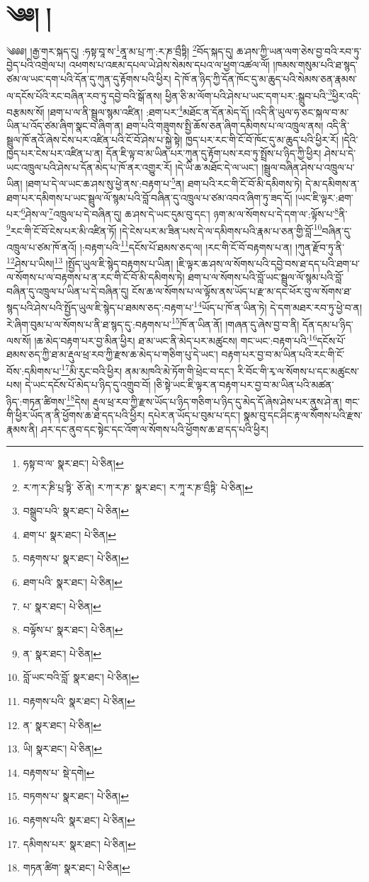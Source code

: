 \setcounter{footnote}{0} 
\chapter{༄༅། །}༄༅༅། །རྒྱ་གར་སྐད་དུ། :ཧསྟ་བཱ་ས་\footnote{ཧསྟ་བ་ལ་  སྣར་ཐང་།  པེ་ཅིན། }ནཱ་མ་པྲ་ཀ་:ར་ཎ་བྲྀཏྟི། \footnote{ར་ཀ་ར་ཎི་པྲ་ཏྟི་  ཅོ་ནེ། ར་ཀ་ར་ཎ་  སྣར་ཐང་། ར་ཀཱ་ར་ཎ་བྲྀཏྟི་  པེ་ཅིན། }བོད་སྐད་དུ། ཆ་ཤས་ཀྱི་ཡན་ལག་ཅེས་བྱ་བའི་རབ་ཏུ་བྱེད་པའི་འགྲེལ་པ། འཕགས་པ་འཇམ་དཔལ་ཡེ་ཤེས་སེམས་དཔའ་ལ་ཕྱག་འཚལ་ལོ། །ཁམས་གསུམ་པའི་ཐ་སྙད་ཙམ་ལ་ཡང་དག་པའི་དོན་དུ་ཀུན་དུ་རྟོགས་པའི་ཕྱིར། དེ་ཁོ་ན་ཉིད་ཀྱི་དོན་ཁོང་དུ་མ་ཆུད་པའི་སེམས་ཅན་རྣམས་ལ་དངོས་པོའི་རང་བཞིན་རབ་ཏུ་དབྱེ་བའི་སྒོ་ནས། ཕྱིན་ཅི་མ་ལོག་པའི་ཤེས་པ་ཡང་དག་པར་:སྒྲུབ་པའི་\footnote{བསྒྲུབ་པའི་  སྣར་ཐང་།  པེ་ཅིན། }ཕྱིར་འདི་བརྩམས་སོ། །ཐག་པ་ལ་ནི་སྦྲུལ་སྙམ་འཛིན། :ཐག་པར་\footnote{ཐག་པ་  སྣར་ཐང་།  པེ་ཅིན། }མཐོང་ན་དོན་མེད་དོ། །འདི་ནི་ཡུལ་ཧ་ཅང་སྐལ་བ་མ་ཡིན་པ་འོད་ཙམ་ཞིག་སྣང་བ་ཞིག་ན། ཐག་པའི་གཟུགས་སྤྱི་ཆོས་ཅན་ཞིག་དམིགས་པ་ལ་འཁྲུལ་ནས། འདི་ནི་སྦྲུལ་ཁོ་ནའོ་ཞེས་ངེས་པར་འཛིན་པའི་ངོ་བོ་ཤེས་པ་སྐྱེ་སྟེ། ཁྱད་པར་རང་གི་ངོ་བོ་ཁོང་དུ་མ་ཆུད་པའི་ཕྱིར་རོ། །དེའི་ཁྱད་པར་ངེས་པར་འཛིན་པ་ན། དོན་ཇི་ལྟ་བ་མ་ཡིན་པར་ཀུན་དུ་རྟོག་པས་རབ་ཏུ་སྤྲོས་པ་ཉིད་ཀྱི་ཕྱིར། ཤེས་པ་དེ་ཡང་འཁྲུལ་པའི་ཤེས་པ་དོན་མེད་པ་ཁོ་ནར་འགྱུར་རོ། །དེ་ཡི་ཆ་མཐོང་དེ་ལ་ཡང་། །སྦྲུལ་བཞིན་ཤེས་པ་འཁྲུལ་པ་ཡིན། །ཐག་པ་དེ་ལ་ཡང་ཆ་ཤས་སུ་ཕྱེ་ནས་:བརྟག་པ་\footnote{བརྟགས་པ་  སྣར་ཐང་།  པེ་ཅིན། }ན། ཐག་པའི་རང་གི་ངོ་བོ་མི་དམིགས་ཏེ། དེ་མ་དམིགས་ན་ཐག་པར་དམིགས་པ་ཡང་སྦྲུལ་ལོ་སྙམ་པའི་བློ་བཞིན་དུ་འཁྲུལ་པ་ཙམ་འབའ་ཞིག་ཏུ་ཟད་དོ། །ཡང་ཇི་ལྟར་:ཐག་པར་\footnote{ཐག་པའི་  སྣར་ཐང་།  པེ་ཅིན། }ཤེས་ལ་\footnote{པ་  སྣར་ཐང་།  པེ་ཅིན། }འཁྲུལ་པ་དེ་བཞིན་དུ། ཆ་ཤས་དེ་ཡང་དུམ་བུ་དང་། ཉག་མ་ལ་སོགས་པ་དེ་དག་ལ་:ལྟོས་པ་\footnote{བལྟོས་པ་  སྣར་ཐང་།  པེ་ཅིན། }ནི་\footnote{ན་  སྣར་ཐང་།  པེ་ཅིན། }རང་གི་ངོ་བོ་ངེས་པར་མི་འཛིན་ཏོ། །དེ་ངེས་པར་མ་ཟིན་པས་དེ་ལ་དམིགས་པའི་རྣམ་པ་ཅན་གྱི་བློ་\footnote{བློ་ཡང་བའི་བློ་  སྣར་ཐང་།  པེ་ཅིན། }བཞིན་དུ་འཁྲུལ་པ་ཙམ་ཁོ་ནའོ། །:བརྟག་པའི་\footnote{བརྟགས་པའི་  སྣར་ཐང་།  པེ་ཅིན། }དངོས་པོ་ཐམས་ཅད་ལ། །རང་གི་ངོ་བོ་བརྟགས་པ་ན། །ཀུན་རྫོབ་ཏུ་ནི་\footnote{ན་  སྣར་ཐང་།  པེ་ཅིན། }ཤེས་པ་ཡིས།\footnote{ཡི།  སྣར་ཐང་།  པེ་ཅིན། } །སྤྱོད་ཡུལ་ཇི་སྙེད་བརྟགས་པ་ཡིན། །ཇི་ལྟར་ཆ་ཤས་ལ་སོགས་པའི་དབྱེ་བས་ཐ་དད་པའི་ཐག་པ་ལ་སོགས་པ་ལ་བརྟགས་པ་ན་རང་གི་ངོ་བོ་མི་དམིགས་ཏེ། ཐག་པ་ལ་སོགས་པའི་བློ་ཡང་སྦྲུལ་ལོ་སྙམ་པའི་བློ་བཞིན་དུ་འཁྲུལ་པ་ཡིན་པ་དེ་བཞིན་དུ། ངོས་ཆ་ལ་སོགས་པ་ལ་ལྟོས་ནས་ཡོད་པ་རྫ་མ་དང་ཕོར་བུ་ལ་སོགས་ཐ་སྙད་པའི་ཤེས་པའི་སྤྱོད་ཡུལ་ཇི་སྙེད་པ་ཐམས་ཅད་:བརྟག་པ་\footnote{བརྟགས་པ་  སྡེ་དགེ། }ཡོད་པ་ཁོ་ན་ཡིན་ཏེ། དེ་དག་མཐར་རབ་ཏུ་ཕྱེ་བ་ན། རེ་ཞིག་བུམ་པ་ལ་སོགས་པ་ནི་ཐ་སྙད་དུ་:བརྟགས་པ་\footnote{བཏགས་པ་  སྣར་ཐང་།  པེ་ཅིན། }ཁོ་ན་ཡིན་ནོ། །གཞན་དུ་ཞེས་བྱ་བ་ནི། དོན་དམ་པ་ཉིད་ལས་སོ། །ཆ་མེད་བརྟག་པར་བྱ་མིན་ཕྱིར། ཐ་མ་ཡང་ནི་མེད་པར་མཚུངས། གང་ཡང་:བརྟག་པའི་\footnote{བརྟགས་པའི་  སྣར་ཐང་།  པེ་ཅིན། }དངོས་པོ་ཐམས་ཅད་ཀྱི་ཐ་མ་རྡུལ་ཕྲ་རབ་ཀྱི་རྫས་ཆ་མེད་པ་གཅིག་པུ་དེ་ཡང་། བརྟག་པར་བྱ་བ་མ་ཡིན་པའི་རང་གི་ངོ་བོས་:དམིགས་པ་\footnote{དམིགས་པར་  སྣར་ཐང་།  པེ་ཅིན། }མི་རུང་བའི་ཕྱིར། ནམ་མཁའི་མེ་ཏོག་གི་ཕྲེང་བ་དང་། རི་བོང་གི་རྭ་ལ་སོགས་པ་དང་མཚུངས་པས། དེ་ཡང་དངོས་པོ་མེད་པ་ཉིད་དུ་འགྲུབ་བོ། །ཅི་སྟེ་ཡང་ཇི་ལྟར་ན་བརྟག་པར་བྱ་བ་མ་ཡིན་པའི་མཚན་ཉིད་:གཏན་ཚིགས་\footnote{གཏན་ཚིག་  སྣར་ཐང་།  པེ་ཅིན། }དེས། རྡུལ་ཕྲ་རབ་ཀྱི་རྫས་ཡོད་པ་ཉིད་གཅིག་པ་ཉིད་དུ་མེད་དོ་ཞེས་ཤེས་པར་ནུས་ཤེ་ན། གང་གི་ཕྱིར་ཡོད་ན་ནི་ཕྱོགས་ཆ་ཐ་དད་པའི་ཕྱིར། དཔེར་ན་ཡོད་པ་བུམ་པ་དང་། སྣམ་བུ་དང་ཤིང་རྟ་ལ་སོགས་པའི་རྫས་རྣམས་ནི། ཤར་དང་ནུབ་དང་སྟེང་དང་འོག་ལ་སོགས་པའི་ཕྱོགས་ཆ་ཐ་དད་པའི་ཕྱིར། 